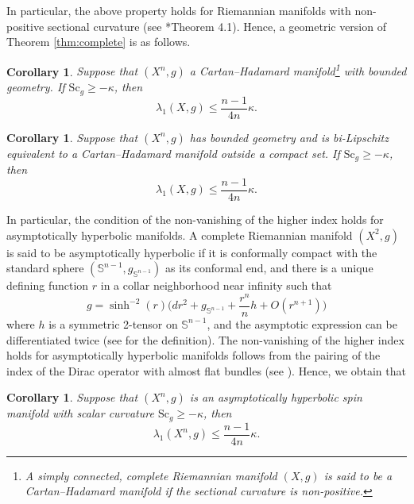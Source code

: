 \documentclass[12pt, reqno]{amsart}
\theoremstyle{plain}%
\newtheorem{corollary}[theorem]{Corollary}
\newtheorem{question}[theorem]{Question}
\theoremstyle{definition}
\theoremstyle{remark}
\numberwithin{equation}{section}
\newcommand{\Sc}{\mathrm{Sc}}
\newcommand{\sph}{\mathbb{S}}
\begin{document}
In particular, the above property holds for Riemannian manifolds with non-positive sectional curvature (see \cite{Yulocalization}*{Theorem 4.1}). Hence, a geometric version of Theorem \ref{thm:complete} is as follows.
\begin{corollary}
	Suppose that $(X^n,g)$ a Cartan--Hadamard manifold\footnote{A simply connected, complete Riemannian manifold $(X,g)$ is said to be a Cartan--Hadamard manifold if the sectional curvature is non-positive.} with bounded geometry. If $\Sc_g \geq -\kappa$, then
	\begin{equation*}
		\lambda_1( X, g) \leq \frac{n-1}{4n}\kappa.
	\end{equation*}
\end{corollary}
\begin{corollary}
	Suppose that $(X^n,g)$ has bounded geometry and is bi-Lipschitz equivalent to a Cartan--Hadamard manifold outside a compact set. If $\Sc_g \geq -\kappa$, then
	\begin{equation*}
		\lambda_1( X, g) \leq \frac{n-1}{4n}\kappa.
	\end{equation*}
\end{corollary}



In particular, the condition of the non-vanishing of the higher index holds for asymptotically hyperbolic manifolds. A complete Riemannian manifold $(X^2,g)$ is said to be asymptotically hyperbolic if it is conformally compact with the standard sphere $(\sph^{n-1},g_{\sph^{n-1}})$ as its conformal end, and there is a unique defining function $r$ in a collar neighborhood near infinity such that
$$g=\sinh^{-2}(r)\big(dr^2+g_{\sph^{n-1}}+\frac{r^n}{n} h+O(r^{n+1})\big)$$
where $h$ is a symmetric 2-tensor on $\sph^{n-1}$, and the asymptotic expression can be differentiated twice (see \cite{MR1879228} for the definition). The non-vanishing of the higher index holds for asymptotically hyperbolic manifolds follows from the pairing of the index of the Dirac operator with almost flat bundles (see  \cite[Chapter 11]{willett2020higher}).
Hence, we obtain that

	\begin{corollary}
		Suppose that $(X^n, g)$ is an asymptotically hyperbolic spin  manifold with scalar curvature $\Sc_g \geq -\kappa$, then
		\[\lambda_1({X}^n, g) \leq  \frac{n-1}{4n}\kappa.\]
	\end{corollary}
%	
\end{document}
